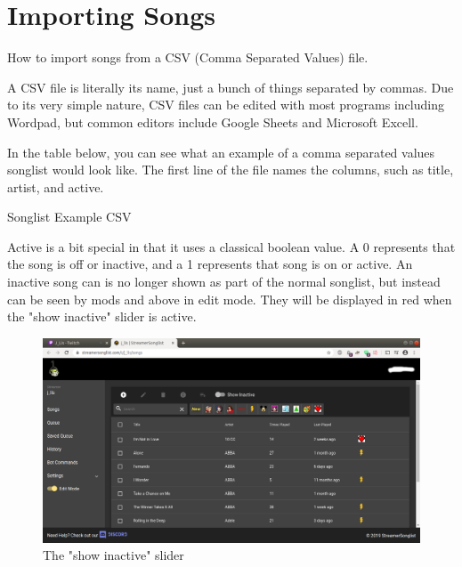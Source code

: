 
\section{Importing Songs}
How to import songs from a CSV (Comma Separated Values) file.

A CSV file is literally its name, just a bunch of things separated by commas. Due to its very simple nature, CSV files can be edited with most programs including Wordpad, but common editors include Google Sheets and Microsoft Excell.

In the table below, you can see what an example of a comma separated values songlist would look like. 
The first line of the file names the columns, such as title, artist, and active. 

\begin{table}[h!]
\caption{Songlist Example CSV}
\label{example.csv}
\end{table}

Active is a bit special in that it uses a classical boolean value. 
A 0 represents that the song is off or inactive, and a 1 represents that song is on or active.
An inactive song can is no longer shown as part of the normal songlist, but instead can be seen by mods and above in edit mode. 
They will be displayed in red when the "show inactive" slider is active.

\begin{figure}[ht!]
  \includegraphics[width=\linewidth]{src/songlist_import/songlist_main_edit.png}
  \caption{The "show inactive" slider}
  \label{show inactive}
\end{figure}

